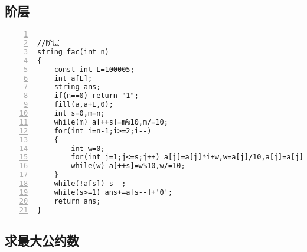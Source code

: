 \subsection{阶层}


\begin{lstlisting}[language={[ANSI]C},numbers=left]

//阶层
string fac(int n)
{
    const int L=100005;
    int a[L];
    string ans;
    if(n==0) return "1";
    fill(a,a+L,0);
    int s=0,m=n;
    while(m) a[++s]=m%10,m/=10;
    for(int i=n-1;i>=2;i--)
    {
        int w=0;
        for(int j=1;j<=s;j++) a[j]=a[j]*i+w,w=a[j]/10,a[j]=a[j]%10;
        while(w) a[++s]=w%10,w/=10;
    }
    while(!a[s]) s--;
    while(s>=1) ans+=a[s--]+'0';
    return ans;
}
\end{lstlisting}

\subsection{求最大公约数}


